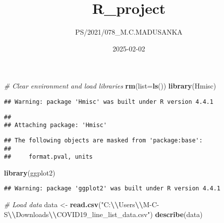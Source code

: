 \documentclass[
]{article}
\title{R\_project}
\author{PS/2021/078\_M.C.MADUSANKA}
\date{2025-02-02}
\newenvironment{Shaded}{\begin{snugshade}}{\end{snugshade}}
\newcommand{\AttributeTok}[1]{\textcolor[rgb]{0.13,0.29,0.53}{#1}}
\newcommand{\CommentTok}[1]{\textcolor[rgb]{0.56,0.35,0.01}{\textit{#1}}}
\newcommand{\FunctionTok}[1]{\textcolor[rgb]{0.13,0.29,0.53}{\textbf{#1}}}
\newcommand{\NormalTok}[1]{#1}
\newcommand{\OtherTok}[1]{\textcolor[rgb]{0.56,0.35,0.01}{#1}}
\newcommand{\SpecialCharTok}[1]{\textcolor[rgb]{0.81,0.36,0.00}{\textbf{#1}}}
\newcommand{\StringTok}[1]{\textcolor[rgb]{0.31,0.60,0.02}{#1}}
\begin{document}
\maketitle

\begin{Shaded}
\begin{Highlighting}[]
\CommentTok{\# Clear environment and load libraries}
\FunctionTok{rm}\NormalTok{(}\AttributeTok{list=}\FunctionTok{ls}\NormalTok{())}
\FunctionTok{library}\NormalTok{(Hmisc)}
\end{Highlighting}
\end{Shaded}

\begin{verbatim}
## Warning: package 'Hmisc' was built under R version 4.4.1
\end{verbatim}

\begin{verbatim}
## 
## Attaching package: 'Hmisc'
\end{verbatim}

\begin{verbatim}
## The following objects are masked from 'package:base':
## 
##     format.pval, units
\end{verbatim}

\begin{Shaded}
\begin{Highlighting}[]
\FunctionTok{library}\NormalTok{(ggplot2)}
\end{Highlighting}
\end{Shaded}

\begin{verbatim}
## Warning: package 'ggplot2' was built under R version 4.4.1
\end{verbatim}

\begin{Shaded}
\begin{Highlighting}[]
\CommentTok{\# Load data}
\NormalTok{data }\OtherTok{\textless{}{-}} \FunctionTok{read.csv}\NormalTok{(}\StringTok{"C:}\SpecialCharTok{\textbackslash{}\textbackslash{}}\StringTok{Users}\SpecialCharTok{\textbackslash{}\textbackslash{}}\StringTok{M{-}C{-}S}\SpecialCharTok{\textbackslash{}\textbackslash{}}\StringTok{Downloads}\SpecialCharTok{\textbackslash{}\textbackslash{}}\StringTok{COVID19\_line\_list\_data.csv"}\NormalTok{)}
\FunctionTok{describe}\NormalTok{(data)}
\end{Highlighting}
\end{Shaded}
\end{document}
